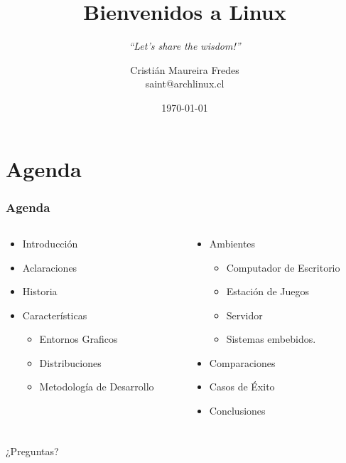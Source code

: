 \documentclass{beamer}
\author{\large Cristián Maureira Fredes\\\normalsize saint@archlinux.cl}
\title{\huge Bienvenidos a Linux}
\subtitle{\Large \textit{``Let's share the wisdom!''}}
\institute{Universidad Técnica\\ Federico Santa María}
\date{\today}
\begin{document}

\section{Agenda}
\frame
{
\frametitle{Agenda}
\begin{columns}
   \begin{column}{0.5\textwidth}
	\begin{itemize}
		\item Introducción
		\item Aclaraciones
		\item Historia
		\item Características
		\begin{itemize}
			\item Entornos Graficos
			\item Distribuciones
			\item Metodología de Desarrollo
		\end{itemize}
	\end{itemize}
	\end{column}

	\begin{column}{0.5\textwidth}
	\begin{itemize}
		\item Ambientes
		\begin{itemize}
			\item Computador de Escritorio
			\item Estación de Juegos
			\item Servidor
			\item Sistemas embebidos.
		\end{itemize}
		\item Comparaciones
		\item Casos de Éxito
		\item Conclusiones
	\end{itemize}
   \end{column}
\end{columns}
}










\frame
{
\frametitle{}
\begin{center}
	\Huge{¿Preguntas?}
\end{center}
}
\end{document}
